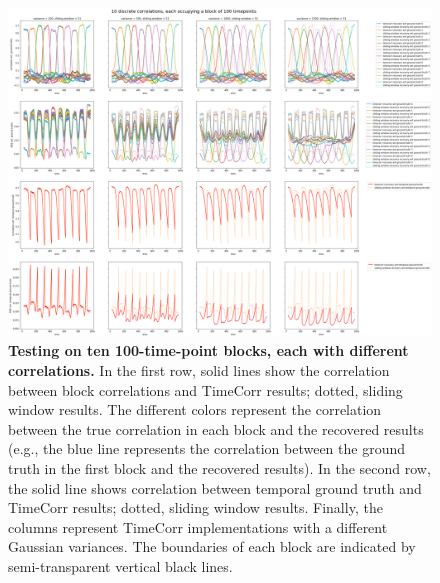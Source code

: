 \documentclass[11pt]{article}
\begin{document}
\begin{figure}[!htb]
\includegraphics[width=1\textwidth]{../figures/SyntheticTesting/10block100t.png}
\caption{\textbf{Testing on ten 100-time-point blocks, each with different correlations.} In the first row, solid lines show the correlation between block correlations and TimeCorr results; dotted, sliding window results. The different colors represent the correlation between the true correlation in each block and the recovered results (e.g., the blue line represents the correlation between the ground truth in the first block and the recovered results). In the second row, the solid line shows correlation between temporal ground truth and TimeCorr results; dotted, sliding window results. Finally, the columns represent TimeCorr implementations with a different Gaussian variances. The boundaries of each block are indicated by semi-transparent vertical black lines.}
\label{fig:10block100t}
\end{figure}
\end{document}
